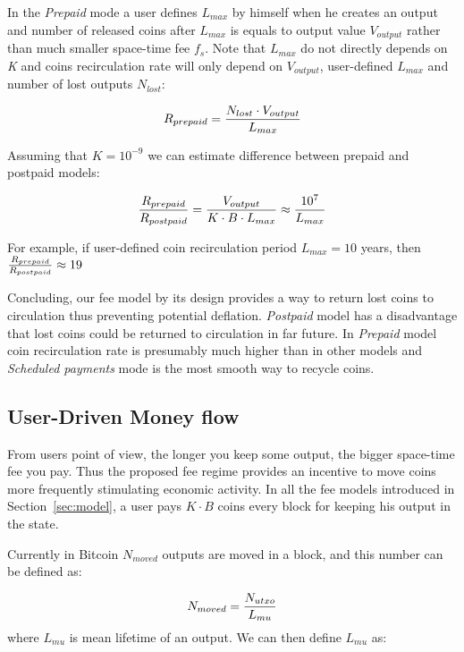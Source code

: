 \documentclass[]{llncs}   %
\begin{document}
In the \textit{Prepaid} mode a user defines $L_{max}$ by himself when he creates an output and number of released coins after $L_{max}$ is equals to output value $V_{output}$ rather than much smaller space-time fee $f_s$. Note that $L_{max}$ do not directly depends on \textit{K} and coins recirculation rate will only depend on $V_{output}$, user-defined $L_{max}$ and number of lost outputs $N_{lost}$:

\begin{equation}
R_{prepaid} = {N_{lost} \cdot V_{output} \over L_{max}}
\end{equation}

Assuming that $K = 10^{-9}$ we can estimate difference between prepaid and postpaid models:

\begin{equation}
{R_{prepaid} \over R_{postpaid}} = {V_{output} \over  K \cdot B \cdot L_{max}} \approx {10^7 \over L_{max}}
\end{equation}

For example, if user-defined coin recirculation period $L_{max} = 10$ years, then ${R_{prepaid} \over R_{postpaid}} \approx 19$

Concluding, our fee model by its design provides a way to return lost coins to circulation thus preventing potential deflation. \textit{Postpaid} model has a disadvantage  that lost coins could be returned to circulation in far future. In \textit{Prepaid} model coin recirculation rate is presumably much higher than in other models and \textit{Scheduled payments} mode is the most smooth way to recycle coins.



\subsection{User-Driven Money flow}
\label{sec:flow}

From users point of view, the longer you keep some output, the bigger space-time fee you pay. Thus the proposed fee regime provides an incentive to move coins more frequently stimulating economic activity. In all the fee models introduced in Section~\ref{sec:model}, a user pays ${K \cdot B}$ coins every block for keeping his output in the state. 

Currently in Bitcoin $N_{moved}$ outputs are moved in a block, and this number can be defined as: 

\begin{equation}
N_{moved} = {N_{utxo} \over L_{mu}}
\end{equation}
where $L_{mu}$ is mean lifetime of an output. We can then define $L_{mu}$ as:
\end{document}
